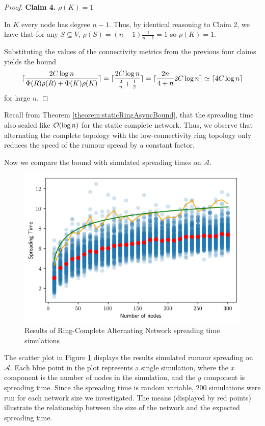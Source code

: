 \begin{proof}
\textbf{Claim 4.}  $\rho(K)=1$

In $K$ every node has degree $n - 1$. Thus, by identical reasoning to Claim 2, we have that for any $S \subseteq V$, $\rho(S) = (n-1)\frac{1}{n-1} = 1$ so $\rho(K) = 1$.

Substituting the values of the connectivity metrics from the previous four claims yields the bound
$$
	\lceil\frac{2C \log n}{\Phi(R)\rho(R) + \Phi(K)\rho(K)}\rceil = \lceil\frac{2C \log n}{\frac{2}{n} + \frac{1}{2}}\rceil
	= \lceil\frac{2n}{4+n} 2C\log n\rceil
	\simeq \lceil4C \log n\rceil
$$
for large $n$.

\end{proof}

Recall from Theorem \ref{theorem:staticRingAsyncBound}, that the spreading time also scaled like $\mathcal{O}(\log n)$ for the static complete network. Thus, we observe that alternating the complete topology with the low-connectivity ring topology only reduces the speed of the rumour spread by a constant factor.


Now we compare the bound with simulated spreading times on $\mathcal{A}$.

\begin{figure}[h]
	\centering
	\includegraphics[width=1\textwidth]{./figures/alternating_ring_simulation_results.png}
	\caption{Results of Ring-Complete Alternating Network spreading time simulations}
	\label{fig:alternatingSimResults}
\end{figure}

The scatter plot in Figure \ref{fig:alternatingSimResults} displays the results simulated rumour spreading on $\mathcal{A}$. Each blue point in the plot represents a single simulation, where the $x$ component is the number of nodes in the simulation, and the $y$ component is spreading time. Since the spreading time is random variable, 200 simulations were run for each network size we investigated. The means (displayed by red points) illustrate the relationship between the size of the network and the expected spreading time. 

